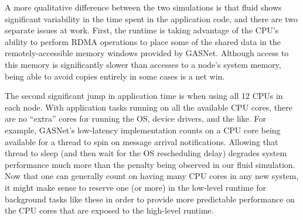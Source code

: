 A more qualitative difference between the two simulations is that fluid shows
significant variability in the time spent in the application code, and there
are two separate issues at work.  First, the runtime is taking advantage of
the CPU's ability to perform RDMA operations to place some of the shared data
in the remotely-accessible memory windows provided by GASNet.  Although access
to this memory is significantly slower than accesses to a node's system memory,
being able to avoid copies entirely in some cases is a net win.

The second significant jump in application time is when using all 12 CPUs in
each node.  With application tasks running on all the available CPU cores,
there are no ``extra'' cores for running the OS, device drivers, and the like.
For example, GASNet's low-latency implementation counts on a CPU core being
available for 
a thread to spin on message arrival notifications.  Allowing that thread to
sleep (and then wait for the OS rescheduling delay) degrades system performance
much more than the penalty being observed in our fluid simulation.  Now that
one can generally count on having many CPU cores in any new system, it might
make sense to reserve one (or more) in the low-level runtime for background
tasks like these in order to provide more predictable performance on the CPU
cores that are exposed to the high-level runtime.

